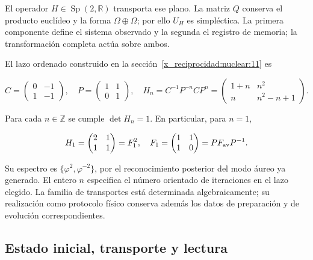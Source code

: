 El operador \(H\in\operatorname{Sp}(2,\mathbb R)\) transporta ese plano. La matriz \(Q\) conserva el producto euclídeo y la forma \(\Omega\oplus\Omega\); por ello \(U_H\) es simpléctica. La primera componente define el sistema observado y la segunda el registro de memoria; la transformación completa actúa sobre ambos.

El lazo ordenado construido en la sección~\ref{x_reciprocidad:nuclear:11} es



\begin{equation}
C=\begin{pmatrix}0&-1\\1&-1\end{pmatrix},\quad
P=\begin{pmatrix}1&1\\0&1\end{pmatrix},\quad
H_n=C^{-1}P^{-n}CP^n
=\begin{pmatrix}1+n&n^2\\n&n^2-n+1\end{pmatrix}.
\label{x_reciprocidad:nuc12:eq:5.2}
\end{equation}



Para cada \(n\in\mathbb Z\) se cumple \(\det H_n=1\). En particular, para \(n=1\),


\begin{equation}
H_1=\begin{pmatrix}2&1\\1&1\end{pmatrix}
=F_1^2,\quad F_1=\begin{pmatrix}1&1\\1&0\end{pmatrix}
=P F_{\rm av}P^{-1}.
\label{x_reciprocidad:nuc12:eq:5.3}
\end{equation}



Su espectro es \(\{\varphi^2,\varphi^{-2}\}\), por el reconocimiento posterior del modo áureo ya generado. El entero \(n\) especifica el número orientado de iteraciones en el lazo elegido. La familia de transportes está determinada algebraicamente; su realización como protocolo físico conserva además los datos de preparación y de evolución correspondientes.

\subsection{Estado inicial, transporte y lectura}

